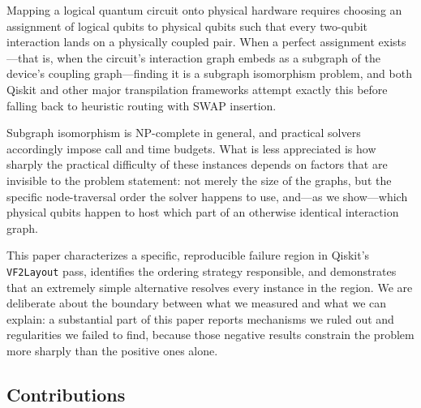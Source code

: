 \documentclass[11pt]{article}
\begin{document}
Mapping a logical quantum circuit onto physical hardware requires
choosing an assignment of logical qubits to physical qubits such that
every two-qubit interaction lands on a physically coupled pair. When a
perfect assignment exists---that is, when the circuit's interaction
graph embeds as a subgraph of the device's coupling graph---finding it
is a subgraph isomorphism problem, and both Qiskit and other major
transpilation frameworks attempt exactly this before falling back to
heuristic routing with SWAP insertion.

Subgraph isomorphism is NP-complete in general, and practical solvers
accordingly impose call and time budgets. What is less appreciated is
how sharply the practical difficulty of these instances depends on
factors that are invisible to the problem statement: not merely the
size of the graphs, but the specific node-traversal order the solver
happens to use, and---as we show---which physical qubits happen to host
which part of an otherwise identical interaction graph.

This paper characterizes a specific, reproducible failure region in
Qiskit's \texttt{VF2Layout} pass, identifies the ordering strategy
responsible, and demonstrates that an extremely simple alternative
resolves every instance in the region. We are deliberate about the
boundary between what we measured and what we can explain: a
substantial part of this paper reports mechanisms we ruled out and
regularities we failed to find, because those negative results
constrain the problem more sharply than the positive ones alone.

\subsection{Contributions}
\end{document}
